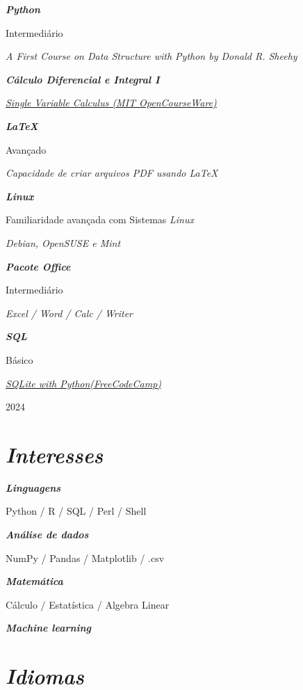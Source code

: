 \documentclass{article}
\newcommand{\cvsection}[1]{\section*{\rmfamily\textit{#1}}}
\begin{document}
{\large

\textbf{\textit{Python}}

\hspace{2em}Intermediário

\hspace{2em}\textit{A First Course on Data Structure with Python by Donald R. Sheehy}


\textbf{\textit{Cálculo Diferencial e Integral I}}

\hspace{2em}\href{https://ocw.mit.edu/courses/18-01-single-variable-calculus-fall-2006/}{\textit{Single Variable Calculus (MIT OpenCourseWare)}}


\textbf{\textit{LaTeX}}

\hspace{2em}Avançado

\hspace{2em}\textit{Capacidade de criar arquivos PDF usando LaTeX}


\textbf{\textit{Linux}}

\hspace{2em}Familiaridade avançada com Sistemas \textit{Linux}

\hspace{2em}\textit{Debian, OpenSUSE e Mint}


\textbf{\textit{Pacote Office}}

\hspace{2em}Intermediário

\hspace{2em}\textit{Excel / Word / Calc / Writer}

\textbf{\textit{SQL}}


\hspace{2em}Básico

\hspace{2em}\href{https://www.youtube.com/watch?v=byHcYRpMgI4&t=70s}{\textit{SQLite with Python(FreeCodeCamp)}}

}


\vfill
\begin{center}
    \Large 2024
\end{center}

\newpage
\indent

\cvsection{Interesses}
\indent

{\large

\textbf{\textit{Linguagens}}

\hspace{2em}Python / R / SQL / Perl / Shell


\textbf{\textit{Análise de dados}}

\hspace{2em}NumPy / Pandas / Matplotlib / .csv

\textbf{\textit{Matemática}}

\hspace{2em}Cálculo / Estatística / Algebra Linear

\textbf{\textit{Machine learning}}

}
\cvsection{Idiomas}
\indent
\end{document}
